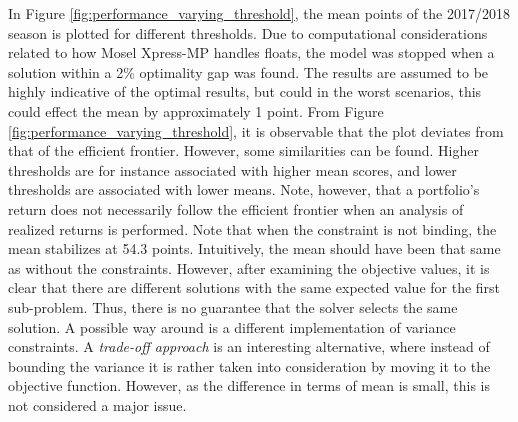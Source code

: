 In Figure \ref{fig:performance_varying_threshold}, the mean points of the 2017/2018 season is plotted for different thresholds. Due to computational considerations related to how Mosel Xpress-MP handles floats, the model was stopped when a solution within a 2\% optimality gap was found. The results are assumed to be highly indicative of the optimal results, but could in the worst scenarios, this could effect the mean by approximately 1 point. From Figure \ref{fig:performance_varying_threshold}, it is observable that the plot deviates from that of the efficient frontier. However, some similarities can be found. Higher thresholds are for instance associated with higher mean scores, and lower thresholds are associated with lower means. Note, however, that a portfolio's return does not necessarily follow the efficient frontier when an analysis of realized returns is performed. Note that when the constraint is not binding, the mean stabilizes at 54.3 points. Intuitively, the mean should have been that same as without the constraints. However, after examining the objective values, it is clear that there are different solutions with the same expected value for the first sub-problem. Thus, there is no guarantee that the solver selects the same solution. A possible way around is a different implementation of variance constraints. A \textit{trade-off approach} \citep{Speranza} is an interesting alternative, where instead of bounding the variance it is rather taken into consideration by moving it to the objective function. However, as the difference in terms of mean is small, this is not considered a major issue.

\newpar

